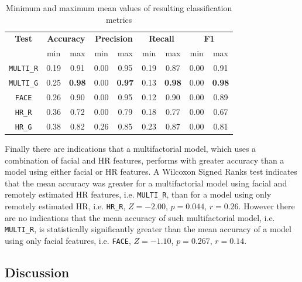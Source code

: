 \begin{table}[!htbp]
  \centering
  \caption{Minimum and maximum mean values of resulting classification metrics}
  \label{table:study5-result-metrics-minmax}
  \begin{tabular}{ccccccccc}
    \toprule%
      \textbf{Test} & \multicolumn{2}{c}{\textbf{Accuracy}} & \multicolumn{2}{c}{\textbf{Precision}} & \multicolumn{2}{c}{\textbf{Recall}} & \multicolumn{2}{c}{\textbf{F1}} \\
      {} & min & max & min & max & min & max & min & max \\
    \midrule%
      \texttt{MULTI\_R}  & 0.19 & 0.91 & 0.00 & 0.95 & 0.19 & 0.87 & 0.00 & 0.91 \\ %
      \texttt{MULTI\_G}  & 0.25 & \textbf{0.98} & 0.00 & \textbf{0.97} & 0.13 & \textbf{0.98} & 0.00 & \textbf{0.98} \\ %
      \texttt{FACE}  & 0.26 & 0.90 & 0.00 & 0.95 & 0.12 & 0.90 & 0.00 & 0.89 \\ %
      \texttt{HR\_R}  & 0.36 & 0.72 & 0.00 & 0.79 & 0.18 & 0.77 & 0.00 & 0.67 \\ %
      \texttt{HR\_G}  & 0.38 & 0.82 & 0.26 & 0.85 & 0.23 & 0.87 & 0.00 & 0.81 \\ %
    \bottomrule%
  \end{tabular}
\end{table}


Finally there are indications that a multifactorial model, which uses a combination of facial and HR features, performs with greater accuracy than a model using either facial or HR features. A Wilcoxon Signed Ranks test indicates that the mean accuracy was greater for a multifactorial model using facial and remotely estimated HR features, i.e. \texttt{MULTI\_R}, than for a model using only remotely estimated HR, i.e. \texttt{HR\_R}, $Z=-2.00$, $p=0.044$, $r=0.26$. However there are no indications that the mean accuracy of such multifactorial model, i.e. \texttt{MULTI\_R}, is statistically significantly greater than the mean accuracy of a model using only facial features, i.e. \texttt{FACE}, $Z=-1.10$, $p=0.267$, $r=0.14$.

\subsection{Discussion}

